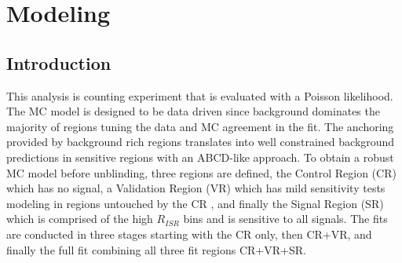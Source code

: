 \setcounter{secnumdepth}{3}
\setcounter{tocdepth}{3}
\setlength{\parskip}{\smallskipamount}
\setlength{\parindent}{0pt}


\makeatletter


\providecommand{\tabularnewline}{\\}


\makeatother

\chapter{Modeling}

\section{Introduction}
This analysis is counting experiment that is evaluated with a Poisson likelihood. The MC model is designed to be data driven since background dominates the majority of regions tuning the data and MC agreement in the fit. The anchoring provided by background rich regions translates into well constrained background predictions in sensitive regions with an ABCD-like approach. To obtain a robust MC model before unblinding, three regions are defined, the Control Region (CR) which has no signal, a Validation Region (VR) which has mild sensitivity tests modeling in regions untouched by the CR , and finally the Signal Region (SR) which is comprised of the high $R_{ISR}$ bins and is sensitive to all signals. The fits are conducted in three stages starting with the CR only, then CR+VR, and finally the full fit combining all three fit regions CR+VR+SR.

